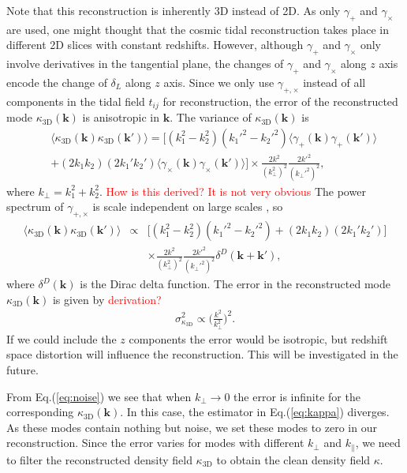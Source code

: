 \documentclass[aps,prd,twocolumn,showpacs,superscriptaddress,groupedaddress,nofootinbib]{revtex4}  %
\newcommand{\mr}{\mathrm}
\begin{document}
Note that this reconstruction is inherently 3D instead of 2D. 
As only  $\gamma_+$ and $\gamma_\times$ are used, one might thought that the cosmic 
tidal reconstruction takes place in different 2D slices with constant redshifts.
However, although $\gamma_+$ and $\gamma_\times$ only involve derivatives in
the tangential plane, the changes of $\gamma_+$ and $\gamma_\times$ along $z$ 
axis encode the change of $\delta_L$ along $z$ axis.
Since we only use $\gamma_{+,\times}$ instead of all components in the tidal field $t_{ij}$
for reconstruction, the error of the reconstructed mode $\kappa_\mr{3D}(\bm{k})$ is 
anisotropic in $\bm{k}$. The variance of $\kappa_\mr{3D}(\bm{k})$ is 
\begin{eqnarray}
&&\langle\kappa_\mr{3D}(\bm{k})\kappa_\mr{3D}(\bm{k}')\rangle=
\big[({k}_{1}^2-{k}_{2}^2)({k_1'}^2-{k_2'}^2)
\langle\gamma_+(\bm{k})\gamma_+(\bm{k}')\rangle\nonumber\\
&&+(2{k}_{1}{k}_{2})(2{k_1'}{k_2'})
\langle\gamma_\times(\bm{k})\gamma_\times(\bm{k}')\rangle\big]
\times\frac{2k^2}{(k_\perp^2)^2}\frac{2{k'}^2}{({k_\perp'}^2)^2},
\end{eqnarray}
where $k_\perp=k_1^2+k_2^2$. \textcolor{red}{How is this derived? It is not very obvious}
The power spectrum of $\gamma_{+,\times}$ is 
scale independent on large scales \cite{1999matias}, so
\begin{eqnarray}
\langle\kappa_\mr{3D}(\bm{k})\kappa_\mr{3D}(\bm{k}')\rangle&\propto&
\big[({k}_{1}^2-{k}_{2}^2)({k_1'}^2-{k_2'}^2)
+(2{k}_{1}{k}_{2})(2{k_1'}{k_2'})\big]\nonumber \\
&&\times\frac{2k^2}{(k_\perp^2)^2}\frac{2{k'}^2}{({k_\perp'}^2)^2}
\delta^D(\bm{k}+\bm{k}'),
\end{eqnarray}
where $\delta^D(\bm{k})$ is the Dirac delta function. 
The error in the reconstructed mode $\kappa_\mr{3D}(\bm{k})$ is given by \textcolor{red}{derivation?}
\begin{eqnarray}
\label{eq:noise}
\sigma^2_{\kappa_\mr{3D}}\propto\bigg(\frac{k^2}{k_\perp^2}\bigg)^2.
\end{eqnarray}
If we could include the $z$ components the error would be isotropic, but 
redshift space distortion will influence the reconstruction. This will be investigated in the 
future. 

From Eq.(\ref{eq:noise}) we see that when $k_\perp\to0$ the error is infinite 
for the corresponding $\kappa_\mr{3D}(\bm{k})$. In this case, the estimator in 
Eq.(\ref{eq:kappa}) diverges. As these modes contain nothing but noise, 
we set these modes to zero in our reconstruction.
Since the error varies for modes with different $k_\perp$ and 
$k_\parallel$, we need to filter the reconstructed density field 
$\kappa_\mr{3D}$ to obtain the  clean density field $\kappa$. 
\end{document}
